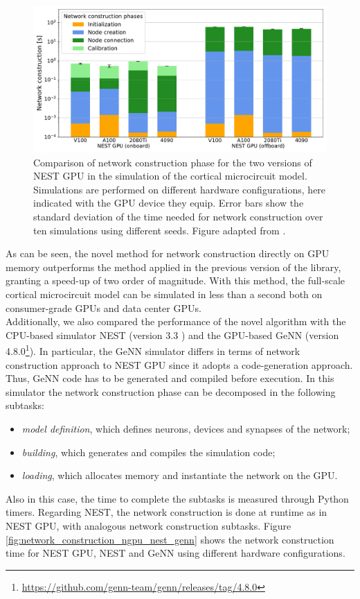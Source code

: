 \documentclass[a4paper, 12pt, twoside, openright]{book}
\begin{document}
\begin{figure}[H]
    \centering
    \includegraphics[width=\columnwidth]{figures/cm_ngpu_net_constr.pdf}
    \caption{Comparison of network construction phase for the two versions of NEST GPU in the simulation of the cortical microcircuit model. Simulations are performed on different hardware configurations, here indicated with the GPU device they equip. Error bars show the standard deviation of the time needed for network construction over ten simulations using different seeds. Figure adapted from \cite{Golosio2023}.}
    \label{fig:cm_network_construction_ngpu}
\end{figure}

As can be seen, the novel method for network construction directly on GPU memory outperforms the method applied in the previous version of the library, granting a speed-up of two order of magnitude. With this method, the full-scale cortical microcircuit model can be simulated in less than a second both on consumer-grade GPUs and data center GPUs.\\
Additionally, we also compared the performance of the novel algorithm with the CPU-based simulator NEST (version 3.3 \cite{nest3.3}) and the GPU-based GeNN \cite{Yavuz2016} (version 4.8.0\footnote{\url{https://github.com/genn-team/genn/releases/tag/4.8.0}}). In particular, the GeNN simulator differs in terms of network construction approach to NEST GPU since it adopts a code-generation approach. Thus, GeNN code has to be generated and compiled before execution. In this simulator the network construction phase can be decomposed in the following subtasks:
\begin{itemize}
    \item \textit{model definition}, which defines neurons, devices and synapses of the network;
    \item \textit{building}, which generates and compiles the simulation code;
    \item \textit{loading}, which allocates memory and instantiate the network on the GPU.
\end{itemize}
Also in this case, the time to complete the subtasks is measured through Python timers. Regarding NEST, the network construction is done at runtime as in NEST GPU, with analogous network construction subtasks. Figure \ref{fig:network_construction_ngpu_nest_genn} shows the network construction time for NEST GPU, NEST and GeNN using different hardware configurations.
\end{document}
